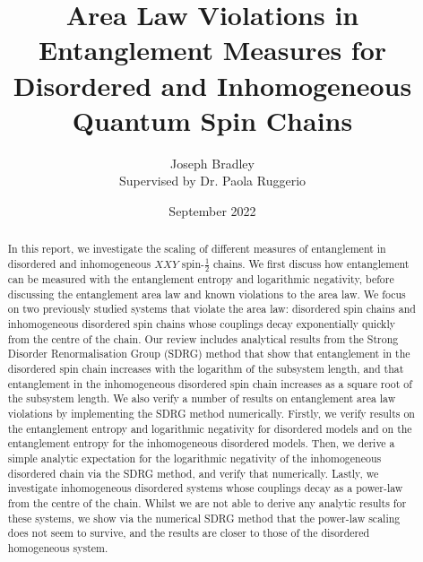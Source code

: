 \documentclass[11pt]{article}
\title{Area Law Violations in Entanglement Measures for Disordered and Inhomogeneous Quantum Spin Chains}
\author{Joseph Bradley \\ Supervised by Dr. Paola Ruggerio}
\date{September 2022}
\begin{document}
\maketitle

\begin{abstract}

In this report, we investigate the scaling of different measures of entanglement in disordered and inhomogeneous $XXY$ spin-$\frac{1}{2}$ chains. We first discuss how entanglement can be measured with the entanglement entropy and logarithmic negativity, before discussing the entanglement area law and known violations to the area law. We focus on two previously studied systems that violate the area law: disordered spin chains and inhomogeneous disordered spin chains whose couplings decay exponentially quickly from the centre of the chain. Our review includes analytical results from the Strong Disorder Renormalisation Group (SDRG) method that show that entanglement in the disordered spin chain increases with the logarithm of the subsystem length, and that entanglement in the inhomogeneous disordered spin chain increases as a square root of the subsystem length. We also verify a number of results on entanglement area law violations by implementing the SDRG method numerically. Firstly, we verify results on the entanglement entropy and logarithmic negativity for disordered models and on the entanglement entropy for the inhomogeneous disordered models. Then, we derive a simple analytic expectation for the logarithmic negativity of the inhomogeneous disordered chain via the SDRG method, and verify that numerically. Lastly, we investigate inhomogeneous disordered systems whose couplings decay as a power-law from the centre of the chain. Whilst we are not able to derive any analytic results for these systems, we show via the numerical SDRG method that the power-law scaling does not seem to survive, and the results are closer to those of the disordered homogeneous system.
\end{abstract}

\tableofcontents


%








\appendix

%

%
%
\printbibliography
\end{document}
